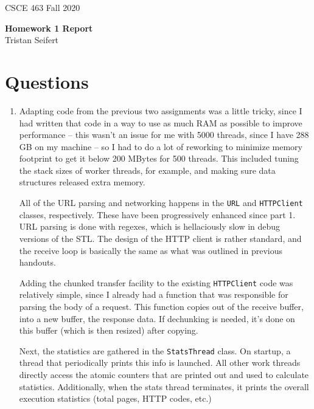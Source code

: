 \documentclass[11pt]{article}
\begin{document}
\newcommand{\answer}[1]{\mbox{~}}

{
\large  CSCE 463 \hfill Fall 2020\\
 \begin{center}
   \textbf{Homework 1 Report} \\
   Tristan Seifert \\
    \end{center}
}

\section{Questions}

\begin{enumerate}

\item {
Adapting code from the previous two assignments was a little tricky, since I had written that code in a way to use as much RAM as possible to improve performance -- this wasn't an issue for me with 5000 threads, since I have 288 GB on my machine -- so I had to do a lot of reworking to minimize memory footprint to get it below 200 MBytes for 500 threads. This included tuning the stack sizes of worker threads, for example, and making sure data structures released extra memory.

All of the URL parsing and networking happens in the \texttt{URL} and \texttt{HTTPClient} classes, respectively. These have been progressively enhanced since part 1. URL parsing is done with regexes, which is hellaciously slow in debug versions of the STL. The design of the HTTP client is rather standard, and the receive loop is basically the same as what was outlined in previous handouts.

Adding the chunked transfer facility to the existing \texttt{HTTPClient} code was relatively simple, since I already had a function that was responsible for parsing the body of a request. This function copies out of the receive buffer, into a new buffer, the response data. If dechunking is needed, it's done on this buffer (which is then resized) after copying.

Next, the statistics are gathered in the \texttt{StatsThread} class. On startup, a thread that periodically prints this info is launched. All other work threads directly access the atomic counters that are printed out and used to calculate statistics. Additionally, when the stats thread terminates, it prints the overall execution statistics (total pages, HTTP codes, etc.)

}
\end{enumerate}
\end{document}
